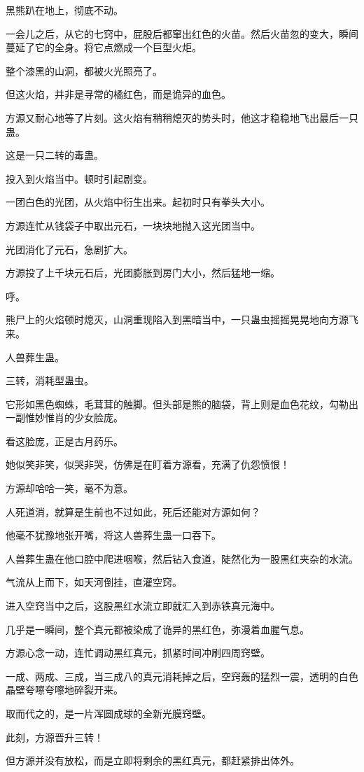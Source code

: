 \begin{this_body}
黑熊趴在地上，彻底不动。

一会儿之后，从它的七窍中，屁股后都窜出红色的火苗。然后火苗忽的变大，瞬间蔓延了它的全身。将它点燃成一个巨型火炬。

整个漆黑的山洞，都被火光照亮了。

但这火焰，并非是寻常的橘红色，而是诡异的血色。

方源又耐心地等了片刻。这火焰有稍稍熄灭的势头时，他这才稳稳地飞出最后一只蛊。

这是一只二转的毒蛊。

投入到火焰当中。顿时引起剧变。

一团白色的光团，从火焰中衍生出来。起初时只有拳头大小。

方源连忙从钱袋子中取出元石，一块块地抛入这光团当中。

光团消化了元石，急剧扩大。

方源投了上千块元石后，光团膨胀到房门大小，然后猛地一缩。

呼。

熊尸上的火焰顿时熄灭，山洞重现陷入到黑暗当中，一只蛊虫摇摇晃晃地向方源飞来。

人兽葬生蛊。

三转，消耗型蛊虫。

它形如黑色蜘蛛，毛茸茸的触脚。但头部是熊的脑袋，背上则是血色花纹，勾勒出一副惟妙惟肖的少女脸庞。

看这脸庞，正是古月药乐。

她似笑非笑，似哭非哭，仿佛是在盯着方源看，充满了仇怨愤恨！

方源却哈哈一笑，毫不为意。

人死道消，就算是生前也不过如此，死后还能对方源如何？

他毫不犹豫地张开嘴，将这人兽葬生蛊一口吞下。

人兽葬生蛊在他口腔中爬进咽喉，然后钻入食道，陡然化为一股黑红夹杂的水流。

气流从上而下，如天河倒挂，直灌空窍。

进入空窍当中之后，这股黑红水流立即就汇入到赤铁真元海中。

几乎是一瞬间，整个真元都被染成了诡异的黑红色，弥漫着血腥气息。

方源心念一动，连忙调动黑红真元，抓紧时间冲刷四周窍壁。

一成、两成、三成，当三成八的真元消耗掉之后，空窍轰的猛烈一震，透明的白色晶壁夸嚓夸嚓地碎裂开来。

取而代之的，是一片浑圆成球的全新光膜窍壁。

此刻，方源晋升三转！

但方源并没有放松，而是立即将剩余的黑红真元，都赶紧排出体外。


\end{this_body}
